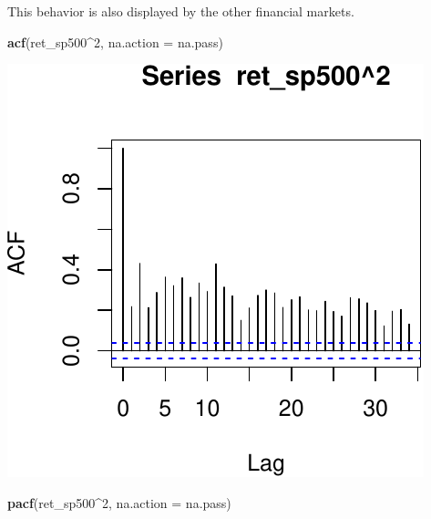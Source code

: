 \documentclass[11pt,]{article}
\newenvironment{Shaded}{\begin{snugshade}}{\end{snugshade}}
\newcommand{\KeywordTok}[1]{\textcolor[rgb]{0.13,0.29,0.53}{\textbf{#1}}}
\newcommand{\DataTypeTok}[1]{\textcolor[rgb]{0.13,0.29,0.53}{#1}}
\newcommand{\DecValTok}[1]{\textcolor[rgb]{0.00,0.00,0.81}{#1}}
\newcommand{\OperatorTok}[1]{\textcolor[rgb]{0.81,0.36,0.00}{\textbf{#1}}}
\newcommand{\NormalTok}[1]{#1}
\begin{document}
This behavior is also displayed by the other financial markets.

\begin{Shaded}
\begin{Highlighting}[]
\KeywordTok{acf}\NormalTok{(ret_sp500}\OperatorTok{^}\DecValTok{2}\NormalTok{, }\DataTypeTok{na.action =}\NormalTok{ na.pass)}
\end{Highlighting}
\end{Shaded}

\begin{center}\includegraphics{FMC_T4_PhD_ARMA_GARCH_files/figure-latex/ret_ind_ACF_sq-1} \end{center}

\begin{Shaded}
\begin{Highlighting}[]
\KeywordTok{pacf}\NormalTok{(ret_sp500}\OperatorTok{^}\DecValTok{2}\NormalTok{, }\DataTypeTok{na.action =}\NormalTok{ na.pass)}
\end{Highlighting}
\end{Shaded}
\end{document}

